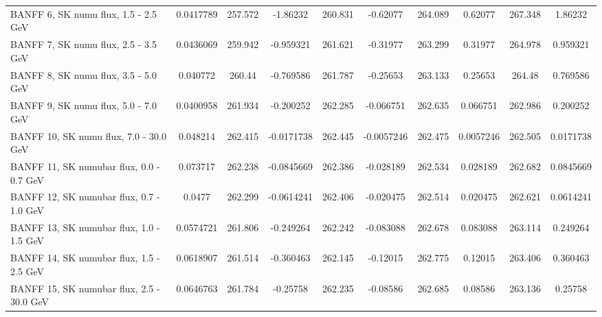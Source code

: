 \begin{tabular}{| l | S | S  S | S  S | S  S | S  S | }
                                           BANFF  6, SK numu flux, 1.5 - 2.5 GeV &       0.0417789 &         257.572 &        -1.86232 &         260.831 &        -0.62077 &         264.089 &         0.62077 &         267.348 &         1.86232 \\ 
                                           BANFF  7, SK numu flux, 2.5 - 3.5 GeV &       0.0436069 &         259.942 &       -0.959321 &         261.621 &        -0.31977 &         263.299 &         0.31977 &         264.978 &        0.959321 \\ 
                                           BANFF  8, SK numu flux, 3.5 - 5.0 GeV &        0.040772 &          260.44 &       -0.769586 &         261.787 &        -0.25653 &         263.133 &         0.25653 &          264.48 &        0.769586 \\ 
                                           BANFF  9, SK numu flux, 5.0 - 7.0 GeV &       0.0400958 &         261.934 &       -0.200252 &         262.285 &       -0.066751 &         262.635 &        0.066751 &         262.986 &        0.200252 \\ 
                                          BANFF 10, SK numu flux, 7.0 - 30.0 GeV &        0.048214 &         262.415 &      -0.0171738 &         262.445 &      -0.0057246 &         262.475 &       0.0057246 &         262.505 &       0.0171738 \\ 
                                        BANFF 11, SK numubar flux, 0.0 - 0.7 GeV &        0.073717 &         262.238 &      -0.0845669 &         262.386 &       -0.028189 &         262.534 &        0.028189 &         262.682 &       0.0845669 \\ 
                                        BANFF 12, SK numubar flux, 0.7 - 1.0 GeV &          0.0477 &         262.299 &      -0.0614241 &         262.406 &       -0.020475 &         262.514 &        0.020475 &         262.621 &       0.0614241 \\ 
                                        BANFF 13, SK numubar flux, 1.0 - 1.5 GeV &       0.0574721 &         261.806 &       -0.249264 &         262.242 &       -0.083088 &         262.678 &        0.083088 &         263.114 &        0.249264 \\ 
                                        BANFF 14, SK numubar flux, 1.5 - 2.5 GeV &       0.0618907 &         261.514 &       -0.360463 &         262.145 &        -0.12015 &         262.775 &         0.12015 &         263.406 &        0.360463 \\ 
                                       BANFF 15, SK numubar flux, 2.5 - 30.0 GeV &       0.0646763 &         261.784 &        -0.25758 &         262.235 &        -0.08586 &         262.685 &         0.08586 &         263.136 &         0.25758 \\ 

\end{tabular}
